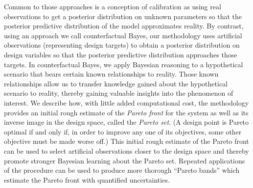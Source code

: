 \documentclass[twocolumn,10pt]{asme2ej}
\begin{document}
%
Common to those approaches is a conception of calibration as using real observations to get a posterior distribution on unknown parameters so that the posterior predictive distribution of the model approximates reality.
%
By contrast, using an approach we call counterfactual Bayes, our methodology uses artificial observations (representing design targets) to obtain a posterior distribution on design variables so that the posterior predictive distribution approaches those targets.
%
In counterfactual Bayes, we apply Bayesian reasoning to a hypothetical scenario that bears certain known relationships to reality.
%
Those known relationships allow us to transfer knowledge gained about the hypothetical scenario to reality, thereby gaining valuable insights into the phenomenon of interest.
%
We describe how, with little added computational cost, the methodology provides an initial rough estimate of the {\em Pareto front} for the system as well as its inverse image in the design space, called the {\em Pareto set}. 
%
(A design point is Pareto optimal if and only if, in order to improve any one of its objectives, some other objective must be made worse off.)
%
%
%
This initial rough estimate of the Pareto front can be used to select artificial observations closer to the design space and thereby promote stronger Bayesian learning about the Pareto set.
%
Repeated applications of the procedure can be used to produce more thorough ``Pareto bands'' which estimate the Pareto front with quantified uncertainties.
%

\end{document}
